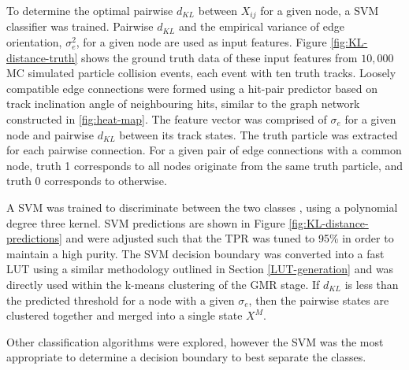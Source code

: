 To determine the optimal pairwise $d_{KL}$ between $X_{ij}$ for a given node, a SVM classifier was trained. Pairwise $d_{KL}$ and the empirical variance of edge orientation, $\sigma_{e}^{2}$, for a given node are used as input features. Figure \ref{fig:KL-distance-truth} shows the ground truth data of these input features from $10,000$ MC simulated particle collision events, each event with ten truth tracks. Loosely compatible edge connections were formed using a hit-pair predictor based on track inclination angle of neighbouring hits, similar to the graph network constructed in \ref{fig:heat-map}. The feature vector was comprised of $\sigma_{e}$ for a given node and pairwise $d_{KL}$ between its track states. The truth particle was extracted for each pairwise connection. For a given pair of edge connections with a common node, truth 1 corresponds to all nodes originate from the same truth particle, and truth 0 corresponds to otherwise. 


A SVM was trained to discriminate between the two classes \cite{scikit-learn}, using a polynomial degree three kernel. SVM predictions are shown in Figure \ref{fig:KL-distance-predictions} and were adjusted such that the TPR was tuned to 95\% in order to maintain a high purity. The SVM decision boundary was converted into a fast LUT using a similar methodology outlined in Section \ref{LUT-generation} and was directly used within the k-means clustering of the GMR stage. If $d_{KL}$ is less than the predicted threshold for a node with a given $\sigma_e$, then the pairwise states are clustered together and merged into a single state $X^M$.


Other classification algorithms were explored, however the SVM was the most appropriate to determine a decision boundary to best separate the classes.

